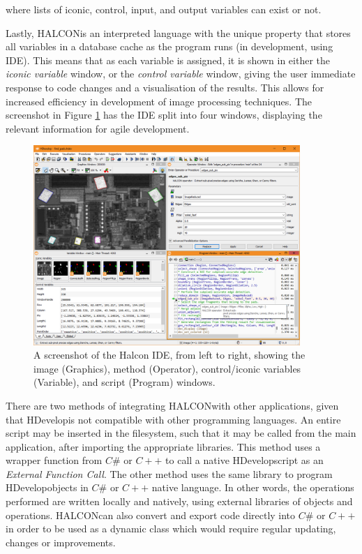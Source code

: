 \documentclass[fleqn,twoside]{article}
\begin{document}
where lists of iconic, control, input, and output variables can exist or not.


Lastly, HALCON\texttrademark is an interpreted language with the unique property that stores all variables in a database cache as the program runs (in development, using IDE). This means that as each variable is assigned, it is shown in either the \textit{iconic variable} window, or the \textit{control variable} window, giving the user immediate response to code changes and a visualisation of the results. This allows for increased efficiency in development of image processing techniques. The screenshot in Figure \ref{fig:halcon_ide} has the IDE split into four windows, displaying the relevant information for agile development.  


\begin{figure}[h]
	\centering
	\includegraphics[width=0.9\textwidth]{halcon_ide.png}
	\caption{A screenshot of the Halcon IDE, from left to right, showing the image (Graphics), method (Operator), control/iconic variables (Variable), and script (Program) windows.}
	\label{fig:halcon_ide}
\end{figure} 


There are two methods of integrating HALCON\texttrademark with other applications, given that HDevelop\texttrademark is not compatible with other programming languages. An entire script may be inserted in the filesystem, such that it may be called from the main application, after importing the appropriate libraries. This method uses a wrapper function from $C\#$ or $C++$ to call a native HDevelop\texttrademark script as an \textit{External Function Call}. The other method uses the same library to program HDevelop\texttrademark objects in $C\#$ or $C++$ native language. In other words, the operations performed are written locally and natively, using external libraries of objects and operations. HALCON\texttrademark can also convert and export code directly into $C\#$ or $C++$ in order to be used as a dynamic class which would require regular updating, changes or improvements.
\end{document}
